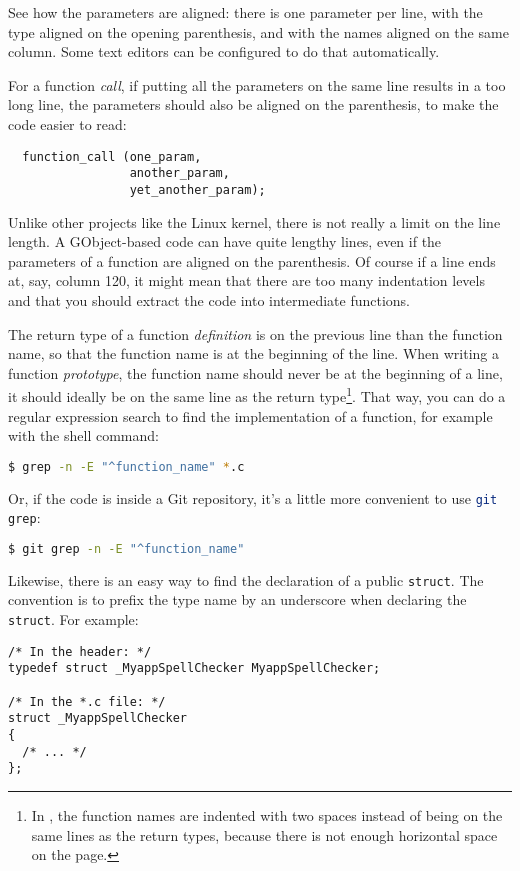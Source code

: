 See how the parameters are aligned: there is one parameter per line, with the type aligned on the opening parenthesis, and with the names aligned on the same column. Some text editors can be configured to do that automatically.

For a function \emph{call}, if putting all the parameters on the same line results in a too long line, the parameters should also be aligned on the parenthesis, to make the code easier to read:
\begin{lstlisting}
  function_call (one_param,
                 another_param,
                 yet_another_param);
\end{lstlisting}

Unlike other projects like the Linux kernel, there is not really a limit on the line length. A GObject-based code can have quite lengthy lines, even if the parameters of a function are aligned on the parenthesis. Of course if a line ends at, say, column 120, it might mean that there are too many indentation levels and that you should extract the code into intermediate functions.

The return type of a function \emph{definition} is on the previous line than the function name, so that the function name is at the beginning of the line. When writing a function \emph{prototype}, the function name should never be at the beginning of a line, it should ideally be on the same line as the return type\footnote{In , the function names are indented with two spaces instead of being on the same lines as the return types, because there is not enough horizontal space on the page.}. That way, you can do a regular expression search to find the implementation of a function, for example with the  shell command:

\begin{lstlisting}[language=bash]
$ grep -n -E "^function_name" *.c
\end{lstlisting}

Or, if the code is inside a Git repository, it's a little more convenient to use \lstinline[language=bash]{git grep}:

\begin{lstlisting}[language=bash]
$ git grep -n -E "^function_name"
\end{lstlisting}

Likewise, there is an easy way to find the declaration of a public \lstinline{struct}. The convention is to prefix the type name by an underscore when declaring the \lstinline{struct}. For example:
\begin{lstlisting}
/* In the header: */
typedef struct _MyappSpellChecker MyappSpellChecker;

/* In the *.c file: */
struct _MyappSpellChecker
{
  /* ... */
};
\end{lstlisting}

